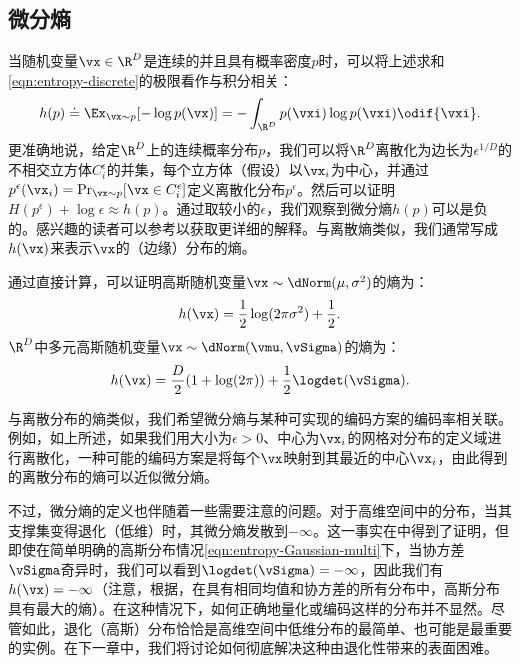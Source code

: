 \documentclass[../../book-main_zh.tex]{subfiles}
\begin{document}
\subsection{微分熵}

当随机变量\(\vx \in \R^{D}\)是连续的并且具有概率密度\(p\)时，可以将上述求和\eqref{eqn:entropy-discrete}的极限看作与积分相关：
\begin{equation}
    h(p) \doteq \Ex_{\vx \sim p}[-\log p(\vx)] = - \int_{\R^{D}}
    p(\vxi) \log p(\vxi) \odif{\vxi}.
    \label{eqn:entropy-differential}
\end{equation}
更准确地说，给定\(\R^{D}\)上的连续概率分布\(p\)，我们可以将\(\R^{D}\)离散化为边长为\(\epsilon^{1/D}\)的不相交立方体\(C_{i}^{\epsilon}\)的并集，每个立方体（假设）以\(\vx_{i}\)为中心，并通过\(p^{\epsilon}(\vx_{i}) = \Pr_{\vx \sim p}[\vx \in C_{i}^{\epsilon}]\)定义离散化分布\(p^{\epsilon}\)。然后可以证明\(H(p^{\epsilon}) + \log \epsilon \approx h(p)\)。通过取较小的\(\epsilon\)，我们观察到微分熵\(h(p)\)可以是负的。感兴趣的读者可以参考\cite{Cover-Thomas}以获取更详细的解释。与离散熵类似，我们通常写成\(h(\vx)\)来表示\(\vx\)的（边缘）分布的熵。

\begin{example}[高斯分布的熵]
    通过直接计算，可以证明高斯随机变量\(\vx \sim \dNorm(\mu, \sigma^{2})\)的熵为：
    \begin{equation}
        h(\vx) = \frac{1}{2}\log (2\pi
        \sigma^{2}) + \frac{1}{2}.
        \label{eqn:entropy-Gaussian}
    \end{equation}
    \(\R^{D}\)中多元高斯随机变量\(\vx \sim \dNorm(\vmu, \vSigma)\)的熵为：
    \begin{equation}
        h(\vx) = \frac{D}{2}(1 + \log(2\pi)) +
        \frac{1}{2}\logdet(\vSigma).
        \label{eqn:entropy-Gaussian-multi}
    \end{equation}
\end{example}

与离散分布的熵类似，我们希望微分熵与某种可实现的编码方案的编码率相关联。例如，如上所述，如果我们用大小为\(\epsilon > 0\)、中心为\(\vx_{i}\)的网格对分布的定义域进行离散化，一种可能的编码方案是将每个\(\vx\)映射到其最近的中心\(\vx_{i}\)，由此得到的离散分布的熵可以近似微分熵\cite{Cover-Thomas}。

不过，微分熵的定义也伴随着一些需要注意的问题。对于高维空间中的分布，当其支撑集变得退化（低维）时，其微分熵发散到\(-\infty\)。这一事实在中得到了证明，但即使在简单明确的高斯分布情况\eqref{eqn:entropy-Gaussian-multi}下，当协方差\(\vSigma\)奇异时，我们可以看到\(\logdet(\vSigma) = -\infty\)，因此我们有\(h(\vx) = -\infty\)（注意，根据，在具有相同均值和协方差的所有分布中，高斯分布具有最大的熵）。在这种情况下，如何正确地量化或编码这样的分布并不显然。尽管如此，退化（高斯）分布恰恰是高维空间中低维分布的最简单、也可能是最重要的实例。在下一章中，我们将讨论如何彻底解决这种由退化性带来的表面困难。
\end{document}
